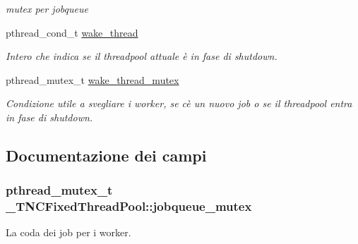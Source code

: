 \begin{DoxyCompactItemize}
\begin{DoxyCompactList}\small\item\em mutex per jobqueue \end{DoxyCompactList}\item 
pthread\+\_\+cond\+\_\+t \hyperlink{struct__TNCFixedThreadPool_a7eea3eb946adb606f4859199b2c6fff5}{wake\+\_\+thread}
\begin{DoxyCompactList}\small\item\em Intero che indica se il threadpool attuale è in fase di shutdown. \end{DoxyCompactList}\item 
\hypertarget{struct__TNCFixedThreadPool_af3febf077b7ff59d11922423d9efe9a9}{}pthread\+\_\+mutex\+\_\+t \hyperlink{struct__TNCFixedThreadPool_af3febf077b7ff59d11922423d9efe9a9}{wake\+\_\+thread\+\_\+mutex}\label{struct__TNCFixedThreadPool_af3febf077b7ff59d11922423d9efe9a9}

\begin{DoxyCompactList}\small\item\em Condizione utile a svegliare i worker, se c\textquotesingle{}è un nuovo job o se il threadpool entra in fase di shutdown. \end{DoxyCompactList}\end{DoxyCompactItemize}


\subsection{Documentazione dei campi}
\hypertarget{struct__TNCFixedThreadPool_a7b2f13485101e6bdacc4894adcce9c33}{}
\subsubsection[{jobqueue\+\_\+mutex}]{\setlength{\rightskip}{0pt plus 5cm}pthread\+\_\+mutex\+\_\+t \+\_\+\+T\+N\+C\+Fixed\+Thread\+Pool\+::jobqueue\+\_\+mutex}\label{struct__TNCFixedThreadPool_a7b2f13485101e6bdacc4894adcce9c33}


La coda dei job per i worker. 

\hypertarget{struct__TNCFixedThreadPool_a228f1fcdc9d0d0fa0f8f895857fe18f2}{}
